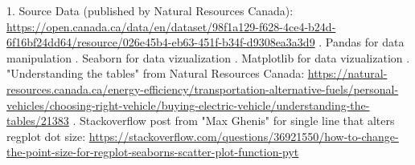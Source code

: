 \documentclass{article}
\begin{document}
{  1. Source  Data (published by Natural Resources Canada): \url{https://open.canada.ca/data/en/dataset/98f1a129-f628-4ce4-b24d-6f16bf24dd64/resource/026e45b4-eb63-451f-b34f-d9308ea3a3d9} . Pandas for data manipulation . Seaborn for data vizualization . Matplotlib for data vizualization . "Understanding the tables" from Natural Resources Canada: \url{https://natural-resources.canada.ca/energy-efficiency/transportation-alternative-fuels/personal-vehicles/choosing-right-vehicle/buying-electric-vehicle/understanding-the-tables/21383} . Stackoverflow post from "Max Ghenis" for single line that alters regplot dot size: \url{https://stackoverflow.com/questions/36921550/how-to-change-the-point-size-for-regplot-seaborns-scatter-plot-function-pyt}
}
\end{document}
